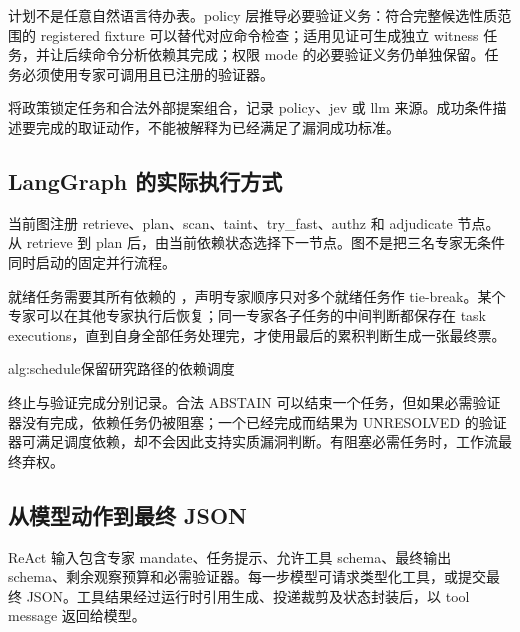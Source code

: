 计划不是任意自然语言待办表。policy 层推导必要验证义务：符合完整候选性质范围的 registered fixture 可以替代对应命令检查；适用见证可生成独立 witness 任务，并让后续命令分析依赖其完成；权限 mode 的必要验证义务仍单独保留。任务必须使用专家可调用且已注册的验证器。

 将政策锁定任务和合法外部提案组合，记录 policy、jev 或 llm 来源。成功条件描述要完成的取证动作，不能被解释为已经满足了漏洞成功标准。

\subsection{LangGraph 的实际执行方式}
当前图注册 retrieve、plan、scan、taint、try\_fast、authz 和 adjudicate 节点。从 retrieve 到 plan 后，由当前依赖状态选择下一节点。图不是把三名专家无条件同时启动的固定并行流程。

就绪任务需要其所有依赖的 ，声明专家顺序只对多个就绪任务作 tie-break。某个专家可以在其他专家执行后恢复；同一专家各子任务的中间判断都保存在 task executions，直到自身全部任务处理完，才使用最后的累积判断生成一张最终票。

\begin{pseudocode}{alg:schedule}{保留研究路径的依赖调度}
\end{pseudocode}

终止与验证完成分别记录。合法 ABSTAIN 可以结束一个任务，但如果必需验证器没有完成，依赖任务仍被阻塞；一个已经完成而结果为 UNRESOLVED 的验证器可满足调度依赖，却不会因此支持实质漏洞判断。有阻塞必需任务时，工作流最终弃权。


\subsection{从模型动作到最终 JSON}
ReAct 输入包含专家 mandate、任务提示、允许工具 schema、最终输出 schema、剩余观察预算和必需验证器。每一步模型可请求类型化工具，或提交最终 JSON。工具结果经过运行时引用生成、投递裁剪及状态封装后，以 tool message 返回给模型。

